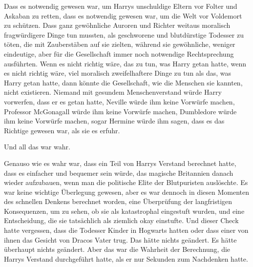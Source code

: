 Dass es notwendig gewesen war, um Harrys unschuldige Eltern vor Folter und Askaban zu retten, dass es notwendig gewesen war, um die Welt vor Voldemort zu schützen. Dass ganz gewöhnliche Auroren und Richter weitaus moralisch fragwürdigere Dinge tun mussten, als geschworene und blutdürstige Todesser zu töten, die mit Zauberstäben auf sie zielten, während sie gewöhnliche, weniger eindeutige, aber für die Gesellschaft immer noch notwendige Rechtsprechung ausführten. Wenn es nicht richtig wäre, das zu tun, was Harry getan hatte, wenn es nicht richtig wäre, viel moralisch zweifelhaftere Dinge zu tun als das, was Harry getan hatte, dann könnte die Gesellschaft, wie die Menschen sie kannten, nicht existieren. Niemand mit gesundem Menschenverstand würde Harry vorwerfen, dass er es getan hatte, Neville würde ihm keine Vorwürfe machen, Professor McGonagall würde ihm keine Vorwürfe machen, Dumbledore würde ihm keine Vorwürfe machen, sogar Hermine würde ihm sagen, dass es das Richtige gewesen war, als sie es erfuhr.

Und all das war wahr.

Genauso wie es wahr war, dass ein Teil von Harrys Verstand berechnet hatte, dass es einfacher und bequemer sein würde, das magische Britannien danach wieder aufzubauen, wenn man die politische Elite der Blutpuristen auslöschte. Es war keine wichtige Überlegung gewesen, aber es war dennoch in diesen Momenten des schnellen Denkens berechnet worden, eine Überprüfung der langfristigen Konsequenzen, um zu sehen, ob sie als katastrophal eingestuft wurden, und eine Entscheidung, die sie tatsächlich als ziemlich okay einstufte. Und dieser Check hatte vergessen, dass die Todesser Kinder in Hogwarts hatten oder dass einer von ihnen das Gesicht von Dracos Vater trug. Das hätte nichts geändert. Es hätte überhaupt nichts geändert. Aber das war die Wahrheit der Berechnung, die Harrys Verstand durchgeführt hatte, als er nur Sekunden zum Nachdenken hatte.

